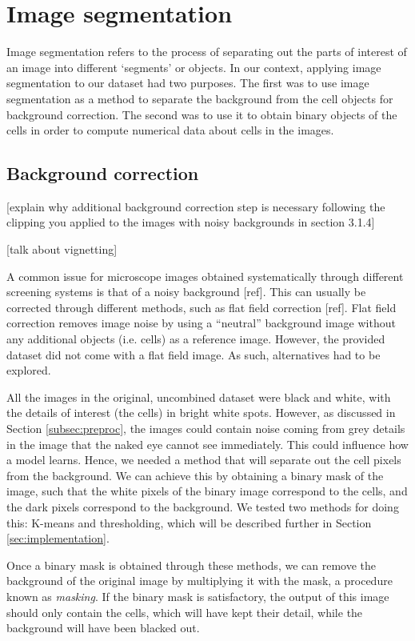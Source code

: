\section{Image segmentation}

Image segmentation refers to the process of separating out the parts of interest of an image into different `segments' or objects. In our context, applying image segmentation to our dataset had two purposes. The first was to use image segmentation as a method to separate the background from the cell objects for background correction. The second was to use it to obtain binary objects of the cells in order to compute numerical data about cells in the images.

\subsection{Background correction} \label{subsec:correction}

[explain why additional background correction step is necessary following the clipping you applied to the images with noisy backgrounds in section 3.1.4]

[talk about vignetting]

A common issue for microscope images obtained systematically through different screening systems is that of a noisy background [ref]. This can usually be corrected through different methods, such as flat field correction [ref]. Flat field correction removes image noise by using a ``neutral” background image without any additional objects (i.e. cells) as a reference image. However, the provided dataset did not come with a flat field image. As such, alternatives had to be explored.

All the images in the original, uncombined dataset were black and white, with the details of interest (the cells) in bright white spots. However, as discussed in Section \ref{subsec:preproc}, the images could contain noise coming from grey details in the image that the naked eye cannot see immediately. This could influence how a model learns. Hence, we needed a method that will separate out the cell pixels from the background. We can achieve this by obtaining a binary mask of the image, such that the white pixels of the binary image correspond to the cells, and the dark pixels correspond to the background. We tested two methods for doing this: K-means and thresholding, which will be described further in Section \ref{sec:implementation}.

Once a binary mask is obtained through these methods, we can remove the background of the original image by multiplying it with the mask, a procedure known as \textit{masking}. If the binary mask is satisfactory, the output of this image should only contain the cells, which will have kept their detail, while the background will have been blacked out.

